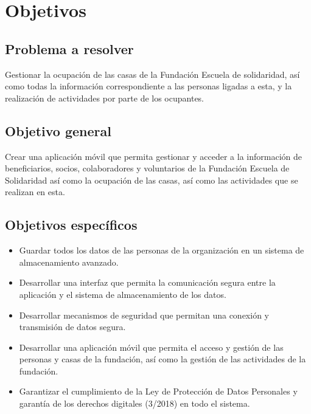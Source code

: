 \section{Objetivos}

\subsection{Problema a resolver}

Gestionar la ocupación de las casas de la Fundación Escuela de solidaridad, así como todas la información correspondiente a las personas ligadas a esta, y la realización de actividades por parte de los ocupantes.

\subsection{Objetivo general}

Crear una aplicación móvil que permita gestionar y acceder a la información de beneficiarios, socios, colaboradores y voluntarios de la Fundación Escuela de Solidaridad así como la ocupación de las casas, así como las actividades que se realizan en esta.

\subsection{Objetivos específicos}

\begin{itemize}
    \item Guardar todos los datos de las personas de la organización en un sistema de almacenamiento avanzado.
    \item Desarrollar una interfaz que permita la comunicación segura entre la aplicación y el sistema de almacenamiento de los datos.
    \item Desarrollar mecanismos de seguridad que permitan una conexión y transmisión de datos segura.
    \item Desarrollar una aplicación móvil que permita el acceso y gestión de las personas y casas de la fundación, así como la gestión de las actividades de la fundación.
    \item Garantizar el cumplimiento de la Ley de Protección de Datos Personales y garantía de los derechos digitales (3/2018) en todo el sistema.
\end{itemize}